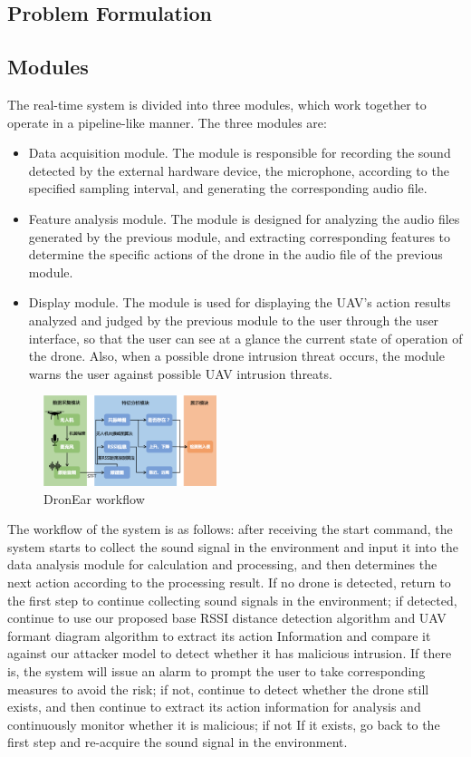 \documentclass{sig-alternate-10pt}
\begin{document}
\subsection{Problem Formulation}


\subsection{Modules}

 The real-time system is divided into three modules, which work together to operate in a pipeline-like manner. The three modules are:
\begin{itemize}
    \item Data acquisition module. The module is responsible for recording the sound detected by the external hardware device, the microphone, according to the specified sampling interval, and generating the corresponding audio file.
    \item Feature analysis module. The module is designed for analyzing the audio files generated by the previous module, and extracting corresponding features to determine the specific actions of the drone in the audio file of the previous module.
    \item Display module. The module is used for displaying the UAV’s action results analyzed and judged by the previous module to the user through the user interface, so that the user can see at a glance the current state of operation of the drone. Also, when a possible drone intrusion threat occurs, the module warns the user against possible UAV intrusion threats.
\end{itemize}
\begin{figure}[!h]
	\centering
	\includegraphics[width=0.45\textwidth]{pics/workflow.png}
	\caption{DronEar workflow}
	
	\label{workflow}
\end{figure}
The workflow of the system is as follows: after receiving the start command, the system starts to collect the sound signal in the environment and input it into the data analysis module for calculation and processing, and then determines the next action according to the processing result. If no drone is detected, return to the first step to continue collecting sound signals in the environment; if detected, continue to use our proposed base RSSI distance detection algorithm and UAV formant diagram algorithm to extract its action Information and compare it against our attacker model to detect whether it has malicious intrusion. If there is, the system will issue an alarm to prompt the user to take corresponding measures to avoid the risk; if not, continue to detect whether the drone still exists, and then continue to extract its action information for analysis and continuously monitor whether it is malicious; if not If it exists, go back to the first step and re-acquire the sound signal in the environment.
\end{document}
